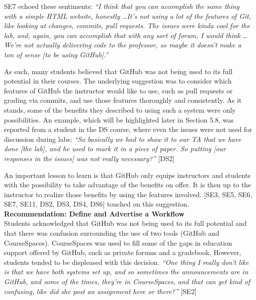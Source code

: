 SE7 echoed these sentiments: \textit{``I think that you can accomplish the same thing with a simple HTML website, honestly \ldots It's not using a lot of the features of Git, like looking at changes, commits, pull requests. The issues were kinda cool for the lab, and, again, you can accomplish that with any sort of forum, I would think \ldots We're not actually delivering code to the professor, so maybe it doesn't make a ton of sense [to be using GitHub].''}

As such, many students believed that GitHub was not being used to its full potential in their courses. The underlying suggestion was to consider which features of GitHub the instructor would like to use, such as pull requests or grading via commits, and use those features thoroughly and consistently. As it stands, some of the benefits they described to using such a system were only possibilities. An example, which will be highlighted later in Section 5.8, was reported from a student in the DS course, where even the issues were not used for discussion during labs: \textit{``So basically we had to show it to our TA that we have done [the lab], and he used to mark it in a piece of paper. So putting [our responses in the issues] was not really necessary?''} [DS2]

An important lesson to learn is that GitHub only equips instructors and students with the possibility to take advantage of the benefits on offer. It is then up to the instructor to realize those benefits by using the features involved. [SE3, SE5, SE6, SE7, SE11, DS2, DS3, DS4, DS6] touched on this suggestion. \\

\textbf{Recommendation: Define and Advertise a Workflow} \\
Students acknowledged that GitHub was not being used to its full potential and that there was confusion surrounding the use of two tools (GitHub and CourseSpaces). CourseSpaces was used to fill some of the gaps in education support offered by GitHub, such as private forums and a gradebook. However, students tended to be displeased with this decision. \textit{``One thing I really don't like is that we have both systems set up, and so sometimes the announcements are in GitHub, and some of the times, they're in CourseSpaces, and that can get kind of confusing, like did she post an assignment here or there?''} [SE2]

